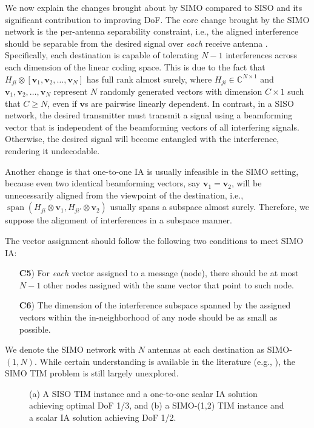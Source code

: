 \documentclass[a4paper,journal]{IEEEtran}
\def\C {\mathbb{C}}
\def\v {\mathbf{v}}
\begin{document}
We now explain the changes brought about by SIMO compared to SISO and its significant contribution to improving DoF. The core change brought by the SIMO network is the per-antenna separability constraint, i.e., the aligned interference should be separable from the desired signal over \textit{each} receive antenna \cite{sun2014topologicalMIMO}.
Specifically, each destination is capable of tolerating $N-1$ interferences across each dimension of the linear coding space. This is due to the fact that $H_{ji} \otimes [\v_1, \v_2, \dots, \v_{N}]$ has full rank almost surely, where $H_{ji}\in \C^{N\times 1}$ and $\v_1, \v_2, \dots, \v_{N}$ represent $N$ randomly generated vectors with dimension $C\times 1$ such that $C \geq N$, even if $\v$s are pairwise linearly dependent.  In contrast, in a SISO network, the desired transmitter must transmit a signal using a beamforming vector that is independent of the beamforming vectors of all interfering signals. Otherwise, the desired signal will become entangled with the interference, rendering it undecodable. 

Another change is that one-to-one IA is usually infeasible in the SIMO setting, 
because even two identical beamforming vectors, say $\v_1=\v_2$, will be unnecessarily aligned from the viewpoint of the destination, i.e., $\operatorname{span}(H_{ji}\otimes \v_1, H_{ji'}\otimes \v_2)$ usually
spans a subspace almost surely. Therefore, we suppose the alignment of interferences in a subspace manner.

The vector assignment should follow the following two conditions to meet SIMO IA:
\begin{adjustwidth}{1em}{}
\begin{itemize}
  \item [\textbf{C5})] For \textit{each} vector assigned to a message (node), there should be at most $N-1$ other nodes assigned with the same vector that point to such node.
  \item [\textbf{C6})] The dimension of the interference subspace spanned by the assigned vectors within the in-neighborhood of any node should be as small as possible.
\end{itemize}
\end{adjustwidth}
We denote the SIMO network with $N$ antennas at each destination as SIMO-$(1,N)$. While certain understanding is available in the literature (e.g., \cite{sun2014topologicalMIMO}), the SIMO TIM problem is still largely unexplored. 
\begin{figure}[t]
   \centering
   \hfil
   \caption{(a) A SISO TIM instance and a one-to-one scalar IA solution achieving optimal DoF 1/3, and (b) a SIMO-(1,2) TIM instance and a scalar IA solution achieving DoF 1/2.}
   \label{MIMO_example1}
\end{figure}
\end{document}
